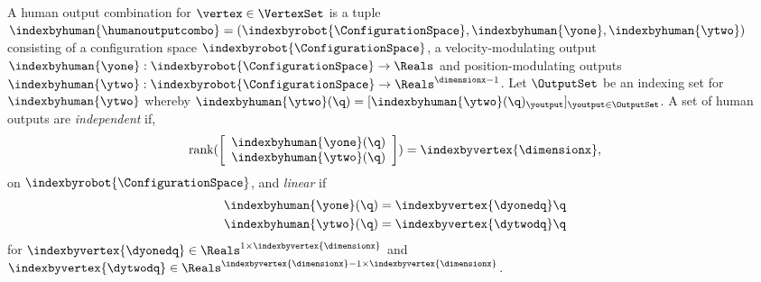 \begin{mydefinition}
A human output combination for $\vertex \in \VertexSet$ is a tuple $\indexbyhuman{\humanoutputcombo} = (\indexbyrobot{\ConfigurationSpace},\indexbyhuman{\yone},\indexbyhuman{\ytwo})$ consisting of a configuration space $\indexbyrobot{\ConfigurationSpace}$, a velocity-modulating output $\indexbyhuman{\yone} : \indexbyrobot{\ConfigurationSpace} \to \Reals$ and position-modulating outputs $\indexbyhuman{\ytwo} : \indexbyrobot{\ConfigurationSpace} \to \Reals^{\dimensionx-1}$. Let $\OutputSet$ be an indexing set for $\indexbyhuman{\ytwo}$ whereby $\indexbyhuman{\ytwo}(\q) = [\indexbyhuman{\ytwo}(\q)_\youtput]_{\youtput \in \OutputSet}$. A set of human outputs are \textit{independent} if,
 \begin{align}
  \text{rank}( \left[
    \begin{array}{c} \indexbyhuman{\yone}(\q) \\
                     \indexbyhuman{\ytwo}(\q)
    \end{array}
    \right]) = \indexbyvertex{\dimensionx},
 \end{align}
on $\indexbyrobot{\ConfigurationSpace}$, and \textit{linear} if
\begin{align}
 \indexbyhuman{\yone}(\q) &= \indexbyvertex{\dyonedq} \q \\
 \indexbyhuman{\ytwo}(\q) &= \indexbyvertex{\dytwodq} \q
\end{align}
for $\indexbyvertex{\dyonedq} \in \Reals^{1 \times \indexbyvertex{\dimensionx}}$ and $\indexbyvertex{\dytwodq} \in \Reals^{\indexbyvertex{\dimensionx}-1 \times \indexbyvertex{\dimensionx}}$.
\end{mydefinition}

